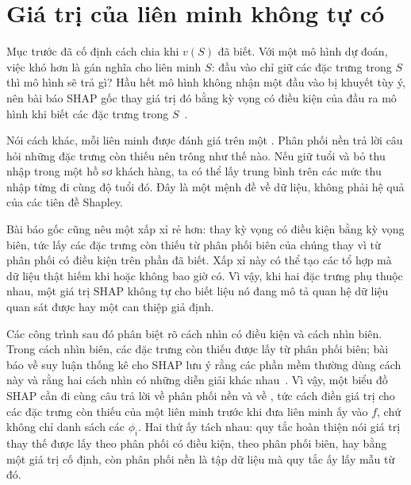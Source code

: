 \section{Giá trị của liên minh không tự có}
\label{sec:ch04-gia-tri-lien-minh-va-phan-phoi-nen}

%
%
Mục trước đã cố định cách chia khi $v(S)$ đã biết. Với một mô hình dự đoán,
việc khó hơn là gán nghĩa cho liên minh $S$: đầu vào chỉ giữ các đặc trưng trong
$S$ thì mô hình sẽ trả gì? Hầu hết mô hình không nhận một đầu vào bị khuyết
tùy ý, nên bài báo SHAP gốc thay giá trị đó bằng kỳ vọng có điều kiện của đầu
ra mô hình khi biết các đặc trưng trong $S$~\autocite{p10shap}.

Nói cách khác, mỗi liên minh được đánh giá trên một . Phân phối nền trả lời câu hỏi những đặc trưng còn thiếu nên trông
như thế nào. Nếu giữ tuổi và bỏ thu nhập trong một hồ sơ khách hàng, ta có thể
lấy trung bình trên các mức thu nhập từng đi cùng độ tuổi đó. Đây là một mệnh
đề về dữ liệu, không phải hệ quả của các tiên đề Shapley.

Bài báo gốc cũng nêu một xấp xỉ rẻ hơn: thay kỳ vọng có điều kiện bằng kỳ vọng
biên, tức lấy các đặc trưng còn thiếu từ phân phối biên của chúng thay vì từ
phân phối có điều kiện trên phần đã biết.
Xấp xỉ này có thể tạo các tổ hợp mà dữ liệu thật hiếm khi hoặc không bao giờ
có. Vì vậy, khi hai đặc trưng phụ thuộc nhau, một giá trị SHAP không tự cho biết
liệu nó đang mô tả quan hệ dữ liệu quan sát được hay một can thiệp giả định.

Các công trình sau đó phân biệt rõ cách nhìn có điều kiện và cách nhìn biên.
Trong cách nhìn biên, các đặc trưng còn thiếu được lấy từ phân phối biên; bài báo
về suy luận thống kê cho SHAP lưu ý rằng các phần mềm thường dùng cách này và
rằng hai cách nhìn có những diễn giải khác nhau~\autocite{p19shapinference}.
Vì vậy, một biểu đồ SHAP cần đi cùng câu trả lời về phân phối nền và về
, tức cách điền giá trị cho các đặc
trưng còn thiếu của một liên minh trước khi đưa liên minh ấy vào $f$, chứ
không chỉ danh sách các $\phi_i$. Hai thứ ấy tách nhau: quy tắc hoàn thiện nói
giá trị thay thế được lấy theo phân phối có điều kiện, theo phân phối biên, hay
bằng một giá trị cố định, còn phân phối nền là tập dữ liệu mà quy tắc ấy lấy
mẫu từ đó.
